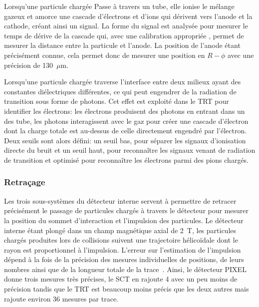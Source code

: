 Lorsqu'une particule chargée Passe à travers un tube, elle ionise le
mélange gazeux et amorce une cascade d'électrons et d'ions qui
dérivent vers l'anode et la cathode, créant ainsi un signal. La forme
du signal est analysée pour mesurer le temps de dérive de la cascade
qui, avec une calibration appropriée %
,
permet de mesurer la distance entre la particule et l'anode. La
position de l'anode étant précisément connue, cela permet donc de
mesurer une position en $R-\phi$ avec une précision de 130~$\mu$m.


Lorsqu'une particule chargée traverse l'interface entre deux milieux
ayant des constantes diélectriques différentes, ce qui peut engendrer
de la radiation de transition sous forme de photons. Cet effet est
exploité dans le TRT pour identifier les électrons: les électrons
produisent des photons en entrant dans un des tube, les photons
interagissent avec le gaz pour créer une cascade d'électron dont la
charge totale est au-dessus de celle directement engendré par
l'électron. Deux seuils sont alors défini: un seuil bas, pour séparer
les signaux d'ionisation directe du bruit et un seuil haut, pour
reconnaître les signaux venant de radiation de transition et optimisé
pour reconnaître les électrons parmi des pions chargés.

\subsubsection{Retraçage}

Les trois sous-systèmes du détecteur interne servent à permettre de
retracer précisément le passage de particules chargés à travers le
détecteur pour mesurer la position du sommet d'interaction et
l'impulsion des particules. Le détecteur interne étant plongé dans un
champ magnétique axial de 2~T, les particules chargés produites lors
de collisions suivent une trajectoire hélicoïdale dont le rayon est
proportionnel à l'impulsion. L'erreur sur l'estimation de l'impulsion
dépend à la fois de la précision des mesures individuelles de
positions, de leurs nombres ainsi que de la longueur totale de la
trace~\cite{olive_detectors_2014}. Ainsi, le détecteur PIXEL donne
trois mesures très précises, le SCT en rajoute 4 avec un peu moins de
précision tandis que le TRT est beaucoup moins précis que les deux autres mais
rajoute environ 36 mesures par trace.

